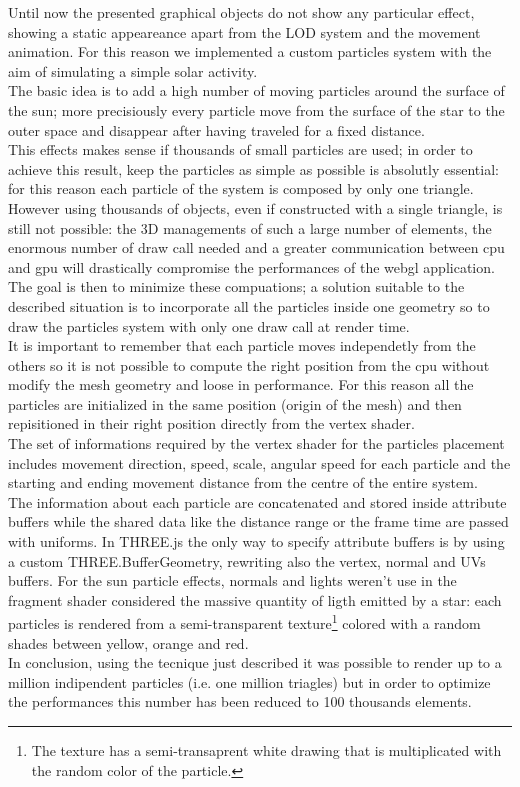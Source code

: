 \documentclass[paper=a4, fontsize=11pt]{scrartcl} %
\numberwithin{equation}{section} %
\numberwithin{figure}{section} %
\numberwithin{table}{section} %
\theoremstyle{definition}
\begin{document}
Until now the presented graphical objects do not show any particular effect, showing a static appeareance apart from the LOD system and the movement animation. For this reason we implemented a custom particles system with the aim of simulating a simple solar activity.\\
The basic idea is to add a high number of moving particles around the surface of the sun; more precisiously every particle move from the surface of the star to the outer space and disappear after having traveled for a fixed distance.\\
This effects makes sense if thousands of small particles are used; in order to achieve this result, keep the particles as simple as possible is absolutly essential: for this reason each particle of the system is composed by only one triangle.\\
However using thousands of objects, even if constructed with a single triangle, is still not possible: the 3D managements of such a large number of elements, the enormous number of draw call needed and a greater communication between cpu and gpu will drastically compromise the performances of the webgl application.\\
The goal is then to minimize these compuations; a solution suitable to the described situation is to incorporate all the particles inside one geometry so to draw the particles system with only one draw call at render time.\\
It is important to remember that each particle moves independetly from the others so it is not possible to compute the right position from the cpu without modify the mesh geometry and loose in performance. For this reason all the particles are initialized in the same position (origin of the mesh) and then repisitioned in their right position directly from the vertex shader.\\
The set of informations required by the vertex shader for the particles placement includes movement direction, speed, scale, angular speed for each particle and the starting and ending movement distance from the centre of the entire system.\\
The information about each particle are concatenated and stored inside attribute buffers while the shared data like the distance range or the frame time are passed with uniforms. In THREE.js the only way to specify attribute buffers is by using a custom THREE.BufferGeometry, rewriting also the vertex, normal and UVs buffers. For the sun particle effects, normals and lights weren't use in the fragment shader considered the massive quantity of ligth emitted by a star: each particles is rendered from a semi-transparent texture\footnote{The texture has a semi-transaprent white drawing that is multiplicated with the random color of the particle.} colored with a random shades between yellow, orange and red.\\
In conclusion, using the tecnique just described it was possible to render up to a million indipendent particles (i.e. one million triagles) but in order to optimize the performances this number has been reduced to 100 thousands elements.
\end{document}
